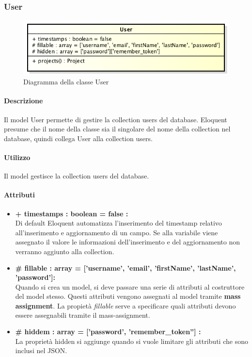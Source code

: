 \subsubsection{User}

	\begin{figure}[h]
		\centering
		\includegraphics[width=0.5\linewidth]{img/User}
		\caption[Diagramma della classe User]{Diagramma della classe User}
	\end{figure}

	\paragraph{Descrizione}
	Il model User permette di gestire la collection users del database. Eloquent presume che il nome della classe sia il singolare del nome della collection nel database, quindi collega User alla collection users.
	
	\paragraph{Utilizzo}
	Il model gestisce la collection users del database.
	
	\paragraph{Attributi}
	\begin{itemize}
		\item \textbf{+ timestamps : boolean = false :}\\
		Di default Eloquent automatizza l'inserimento del timestamp relativo all'inserimento e aggiornamento di un campo. Se alla variabile viene assegnato il valore le informazioni dell'inserimento e del aggiornamento non verranno aggiunto alla collection.
		\item \textbf{\# fillable : array = ['username', 'email', 'firstName', 'lastName', 'password']:}\\
		Quando si crea un model, si deve passare una serie di attributi al costruttore del model stesso. Questi attributi vengono assegnati al model tramite \textbf{mass assignment}. La propietà \textit{fillable} serve a specificare quali attributi devono essere assegnabili tramite il mass-assignment.
		\item \textbf{\# hiddem : array = ['password', 'remember\_token''] : }\\
		La proprietà hidden si aggiunge quando si vuole limitare gli attributi che sono inclusi nel JSON.
	\end{itemize}
	
